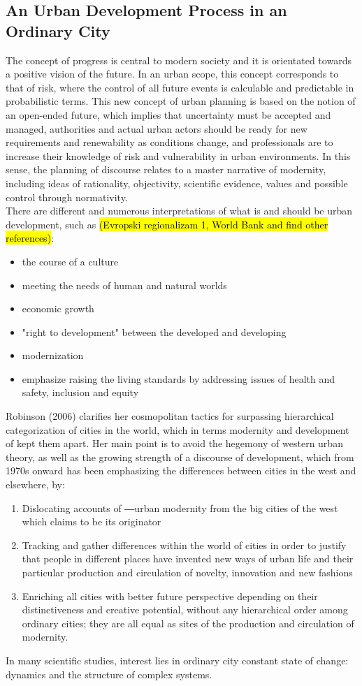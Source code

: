 \documentclass[11pt]{report}
\begin{document}
\subsection{An Urban Development Process in an Ordinary City}
The concept of progress is central to modern society and it is orientated towards a positive vision of the future. In an urban scope, this concept corresponds to that of risk, where the control of all future events is calculable and predictable in probabilistic terms. This new concept of urban planning is based on the notion of an open-ended future, which implies that uncertainty must be accepted and managed, authorities and actual urban actors should be ready for new requirements and renewability as conditions change, and professionals are to increase their knowledge of risk and vulnerability in urban environments. In this sense, the planning of discourse relates to a master narrative of modernity, including ideas of rationality, objectivity, scientific evidence, values and possible control through normativity.
\\
There are different and numerous interpretations of what is and should be urban development, such as \hl{(Evropski regionalizam 1, World Bank and find other references)}:
\begin{itemize}
\item the course of a culture
\item meeting the needs of human and natural worlds
\item economic growth
\item "right to development" between the developed and developing
\item modernization
\item emphasize raising the living standards by addressing issues of health and safety, inclusion and equity
\end{itemize}  
Robinson (2006) clarifies   her  cosmopolitan  tactics  for  surpassing  hierarchical categorization of cities in the world, which in terms modernity and development of kept them apart. Her main point is to avoid the hegemony of western urban theory, as  well as the growing  strength of a discourse of development, which from 1970s onward has been emphasizing the differences between cities in the west and elsewhere, by: 
\begin{enumerate}
\item Dislocating accounts of ―urban modernity from the big cities of the west which claims to be its 
originator
\item Tracking  and  gather  differences  within  the  world  of  cities  in  order  to  justify  that  people  in different  places  have  invented  new  ways  of  urban  life  and  their  particular  production  and circulation of novelty, innovation and new fashions
\item Enriching  all  cities  with  better  future  perspective  depending  on  their  distinctiveness  and creative potential, without any hierarchical order among ordinary cities; they are all equal as 
sites of the production and circulation of modernity.
\end{enumerate}
In many scientific studies, interest lies in ordinary city constant state of change: dynamics and the structure of complex systems.
\end{document}
